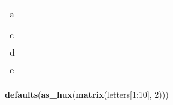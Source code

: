 \documentclass[]{article}
\newenvironment{Shaded}{\begin{snugshade}}{\end{snugshade}}
\newcommand{\KeywordTok}[1]{\textcolor[rgb]{0.13,0.29,0.53}{\textbf{{#1}}}}
\newcommand{\DecValTok}[1]{\textcolor[rgb]{0.00,0.00,0.81}{{#1}}}
\newcommand{\NormalTok}[1]{{#1}}
\begin{document}
\begin{table}[h]
\begin{centering}\begin{tabularx}{0.5\textwidth}{p{}}
\multicolumn{1}{p{0.5\textwidth}}{\raggedright\cellcolor[RGB]{230, 230, 230} \rule{0pt}{\baselineskip+4pt}\hspace*{4pt}a\hspace*{4pt}\rule[-4pt]{0pt}{4pt}} \tabularnewline[-0.5pt]
\hhline{>{\arrayrulecolor{black}}-}
\arrayrulecolor{black}
\multicolumn{1}{p{0.5\textwidth}}{\raggedright\rule{0pt}{\baselineskip+4pt}\hspace*{4pt}b\hspace*{4pt}\rule[-4pt]{0pt}{4pt}} \tabularnewline[-0.5pt]
\multicolumn{1}{p{0.5\textwidth}}{\raggedright\cellcolor[RGB]{230, 230, 230} \rule{0pt}{\baselineskip+4pt}\hspace*{4pt}c\hspace*{4pt}\rule[-4pt]{0pt}{4pt}} \tabularnewline[-0.5pt]
\multicolumn{1}{p{0.5\textwidth}}{\raggedright\rule{0pt}{\baselineskip+4pt}\hspace*{4pt}d\hspace*{4pt}\rule[-4pt]{0pt}{4pt}} \tabularnewline[-0.5pt]
\multicolumn{1}{p{0.5\textwidth}}{\raggedright\cellcolor[RGB]{230, 230, 230} \rule{0pt}{\baselineskip+4pt}\hspace*{4pt}e\hspace*{4pt}\rule[-4pt]{0pt}{4pt}} \tabularnewline[-0.5pt]
\end{tabularx}
\par\end{centering}
\end{table}

\begin{Shaded}
\begin{Highlighting}[]
\KeywordTok{defaults}\NormalTok{(}\KeywordTok{as_hux}\NormalTok{(}\KeywordTok{matrix}\NormalTok{(letters[}\DecValTok{1}\NormalTok{:}\DecValTok{10}\NormalTok{], }\DecValTok{2}\NormalTok{)))}
\end{Highlighting}
\end{Shaded}
\end{document}
